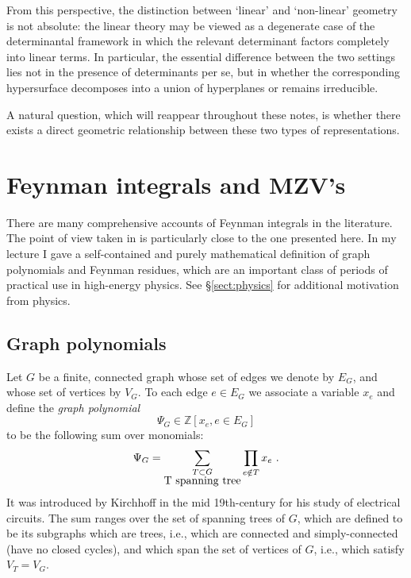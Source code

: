 \documentclass[12pt]{amsart}
\newcommand{\ZZ}{{\mathbb Z}}
\theoremstyle{plain}
\newcommand{\0}{\color{blue}{\mathsf{0}}}
\begin{document}
From this perspective, the distinction between `linear' and `non-linear' geometry is not absolute: the linear theory may be viewed as a degenerate case of the determinantal framework in which the relevant determinant factors completely into linear terms. In particular, the essential difference between the two settings lies not in the presence of determinants per se, but in whether the corresponding hypersurface decomposes into a union of hyperplanes or remains irreducible.


A natural question, which will reappear throughout these notes, is whether there exists a direct geometric  relationship between these two types of representations.


\section{Feynman integrals and MZV's}  \label{sect:FeynmanMZVs}

There are many comprehensive accounts of Feynman integrals in the literature. The point of view taken in \cite{Panzer, Schnetz} is particularly close to the one presented here. In my lecture I gave a self-contained and purely mathematical definition of graph polynomials and Feynman residues, which are an important  class of periods  of practical use in high-energy physics. See \S\ref{sect:physics} for additional motivation from physics. 



\subsection{Graph polynomials}  \label{sect: GraphPolys}
Let $G$ be a finite, connected graph whose set of edges we denote by  $E_G$, and whose set of vertices by $V_G$. To each edge $e\in E_G$  we associate a variable  $x_e$ and define  the \emph{graph polynomial}
\[ \Psi_G \in \ZZ [x_e, e\in E_G]\]
to be the following sum over monomials:
\[ \Psi_G = \sum_{\substack{T\subset G \\ \hbox{T spanning tree} }} \prod_{e\notin T } x_e \ . \]
It was introduced by Kirchhoff in the mid 19th-century for his  study of electrical circuits. 
The  sum ranges over the set of spanning trees of $G$, which are defined to be its subgraphs which are trees, i.e., which  are connected and simply-connected (have no closed cycles), and which span the set of vertices of $G$, i.e., which satisfy $V_T =V_G$. 
\end{document}
